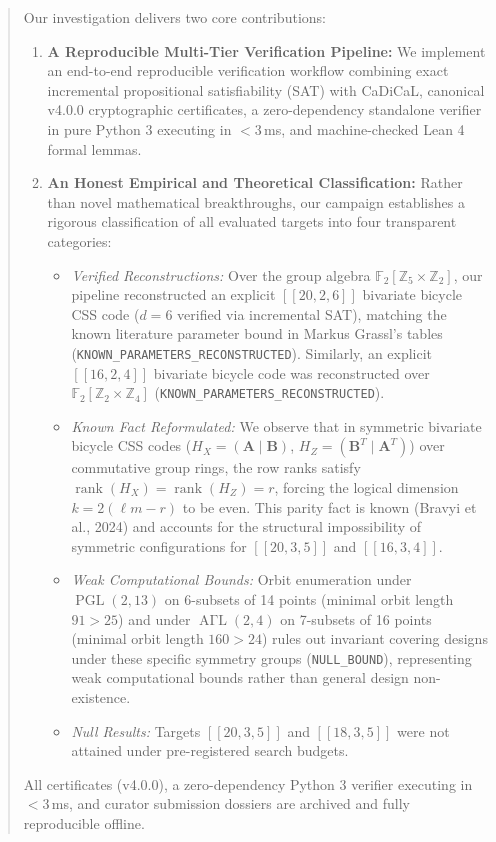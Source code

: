 \documentclass[11pt,a4paper]{article}
\begin{document}
\begin{abstract}
Our investigation delivers two core contributions:
\begin{enumerate}
    \item \textbf{A Reproducible Multi-Tier Verification Pipeline:} We implement an end-to-end reproducible verification workflow combining exact incremental propositional satisfiability (SAT) with CaDiCaL, canonical v4.0.0 cryptographic certificates, a zero-dependency standalone verifier in pure Python 3 executing in $< 3$\,ms, and machine-checked Lean 4 formal lemmas.
    \item \textbf{An Honest Empirical and Theoretical Classification:} Rather than novel mathematical breakthroughs, our campaign establishes a rigorous classification of all evaluated targets into four transparent categories:
    \begin{itemize}
        \item \emph{Verified Reconstructions:} Over the group algebra $\mathbb{F}_2[\mathbb{Z}_5 \times \mathbb{Z}_2]$, our pipeline reconstructed an explicit $[[20, 2, 6]]$ bivariate bicycle CSS code ($d=6$ verified via incremental SAT), matching the known literature parameter bound in Markus Grassl's tables (\texttt{KNOWN\_PARAMETERS\_RECONSTRUCTED}). Similarly, an explicit $[[16, 2, 4]]$ bivariate bicycle code was reconstructed over $\mathbb{F}_2[\mathbb{Z}_2 \times \mathbb{Z}_4]$ (\texttt{KNOWN\_PARAMETERS\_RECONSTRUCTED}).
        \item \emph{Known Fact Reformulated:} We observe that in symmetric bivariate bicycle CSS codes ($H_X = (\mathbf{A} \mid \mathbf{B})$, $H_Z = (\mathbf{B}^T \mid \mathbf{A}^T)$) over commutative group rings, the row ranks satisfy $\operatorname{rank}(H_X) = \operatorname{rank}(H_Z) = r$, forcing the logical dimension $k = 2(\ell m - r)$ to be even. This parity fact is known (Bravyi et al., 2024) and accounts for the structural impossibility of symmetric configurations for $[[20, 3, 5]]$ and $[[16, 3, 4]]$.
        \item \emph{Weak Computational Bounds:} Orbit enumeration under $\operatorname{PGL}(2, 13)$ on 6-subsets of 14 points (minimal orbit length $91 > 25$) and under $\operatorname{A\Gamma L}(2, 4)$ on 7-subsets of 16 points (minimal orbit length $160 > 24$) rules out invariant covering designs under these specific symmetry groups (\texttt{NULL\_BOUND}), representing weak computational bounds rather than general design non-existence.
        \item \emph{Null Results:} Targets $[[20, 3, 5]]$ and $[[18, 3, 5]]$ were not attained under pre-registered search budgets.
    \end{itemize}
\end{enumerate}
All certificates (v4.0.0), a zero-dependency Python 3 verifier executing in $< 3$\,ms, and curator submission dossiers are archived and fully reproducible offline.
\end{abstract}
\end{document}
